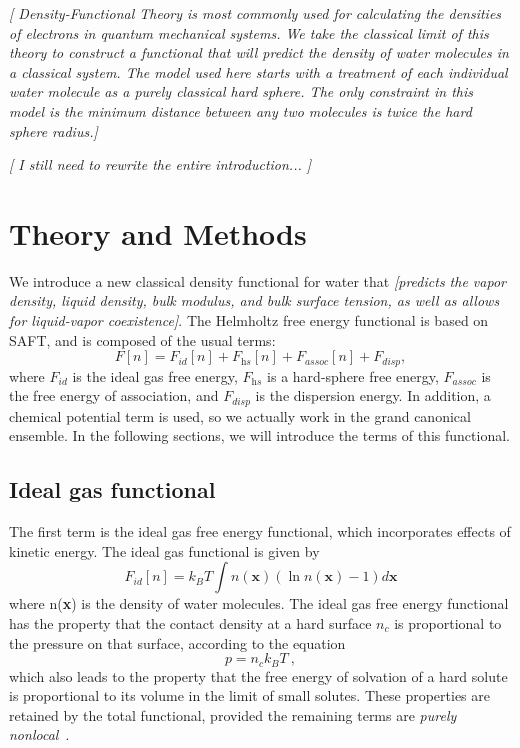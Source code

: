 \documentclass[letterpaper,twocolumn,amsmath,amssymb,prb]{revtex4-1}
\newcommand{\xx}{\textbf{x}}
\newcommand{\needsworklater}[1]{\emph{[#1]}}
\begin{document}
\needsworklater{
Density-Functional Theory is most commonly used for calculating the
densities of electrons in quantum mechanical systems.  We take the
classical limit of this theory to construct a functional that will predict
the density of water molecules in a classical system.  The model used here
starts with a treatment of each individual water molecule as a purely
classical hard sphere.  The only constraint in this model is
the minimum distance between any two molecules is twice the hard sphere
radius.}

\needsworklater{ I still need to rewrite the entire introduction... }

\section{Theory and Methods}
We introduce a new classical density functional for water that
\needsworklater{predicts the vapor density, liquid density, bulk
  modulus, and bulk surface tension, as well as allows for
  liquid-vapor coexistence}.  The Helmholtz free energy functional is
based on SAFT, and is composed of the usual terms:
\begin{equation}
  F[n] = F_\textit{id}[n] + F_\textit{hs}[n] + F_\textit{assoc}[n] + F_\textit{disp},
\end{equation}
where $F_\textit{id}$ is the ideal gas free energy, $F_\textit{hs}$ is
a hard-sphere free energy, $F_\textit{assoc}$ is the free energy of
association, and $F_\textit{disp}$ is the dispersion energy.  In
addition, a chemical potential term is used, so we actually work in
the grand canonical ensemble.  In the following sections, we will
introduce the terms of this functional.

\subsection{Ideal gas functional}
The first term is the ideal gas free energy functional,
which incorporates effects of kinetic energy.  The ideal gas
functional is given by
\begin{equation}\label{idealgas}
  F_{id}[n] = k_B T \int n(\xx)\left( \ln{n(\xx)} - 1\right) d\xx
\end{equation}
where n(\xx) is the density of water molecules.  The ideal gas free
energy functional has the property that the contact density at a hard
surface $n_c$ is proportional to the pressure on that surface,
according to the equation
\begin{equation}
  p = n_c k_BT \:,
\end{equation}
which also leads to the property that the free energy of solvation of
a hard solute is proportional to its volume in the limit of small
solutes.  These properties are retained by the total functional,
provided the remaining terms are \emph{purely
  nonlocal}~\cite{ashcroft?}.
\end{document}
